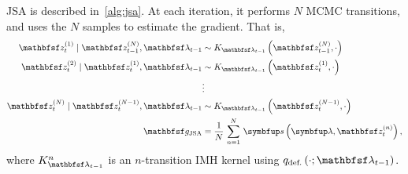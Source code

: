 \begin{proofEnd}

  JSA is described in~\cref{alg:jsa}. 
  At each iteration, it performs \(N\) MCMC transitions, and uses the \(N\) samples to estimate the gradient.
  That is,
  \begin{align*}
    \rvvz^{(1)}_{t} \mid \rvvz_{t-1}^{(N)}, \rvvlambda_{t-1} &\sim K_{\rvvlambda_{t-1}}\left(\rvvz_{t-1}^{(N)}, \cdot\right) \\
    \rvvz^{(2)}_{t} \mid \rvvz^{(1)}_{t}, \rvvlambda_{t-1}  &\sim K_{\rvvlambda_{t-1}}\left(\rvvz_{t}^{(1)}, \cdot\right) \\
    &\vdots
    \\
    \rvvz^{(N)}_{t} \mid \rvvz^{(N-1)}_{t}, \rvvlambda_{t-1}  &\sim K_{\rvvlambda_{t-1}}\left(\rvvz_{t}^{(N-1)}, \cdot\right)
    \\
    \rvvg_{\text{JSA}} &= \frac{1}{N}\,\sum^{N}_{n=1} \, \vs\left(\vlambda, \rvvz^{(n)}_t\right),
  \end{align*}
  where \(K_{\rvvlambda_{t-1}}^n\) is an \(n\)-transition IMH kernel using \(q_{\text{def.}}\left(\cdot; \rvvlambda_{t-1}\right)\).


\end{proofEnd}
